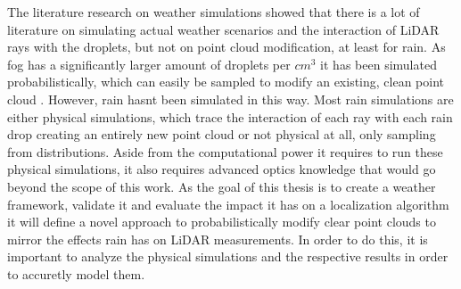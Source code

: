 The literature research on weather simulations showed that there is a lot of literature on simulating actual weather scenarios and the interaction of LiDAR rays with the droplets, but not on point cloud modification, at least for rain. As fog has a significantly larger amount of droplets per $cm^3$ it has been simulated probabilistically, which can easily be sampled to modify an existing, clean point cloud \cite{teufel_simulating_2022}. However, rain hasnt been simulated in this way. Most rain simulations are either physical simulations, which trace the interaction of each ray with each rain drop creating an entirely new point cloud or not physical at all, only sampling from distributions. Aside from the computational power it requires to run these physical simulations, it also requires advanced optics knowledge that would go beyond the scope of this work. As the goal of this thesis is to create a weather framework, validate it and evaluate the impact it has on a localization algorithm it will define a novel approach to probabilistically modify clear point clouds to mirror the effects rain has on LiDAR measurements. In order to do this, it is important to analyze the physical simulations and the respective results in order to accuretly model them. 












